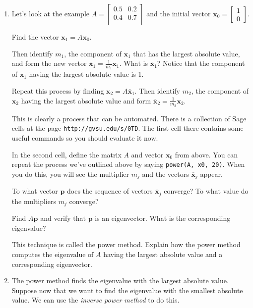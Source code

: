 \documentclass[12pt]{article}
\newcommand{\vs}[1]{\vspace{#1in}}
\newcommand{\xvec}{{\mathbf x}}
\newcommand{\pvec}{{\mathbf p}}
\newcommand{\twovec}[2]{\left[\begin{array}{r}#1 \\ #2
    \end{array}\right]}
\begin{document}
\begin{enumerate}
\item Let's look at the example
  $
  A =
  \left[
    \begin{array}{cc}
      0.5 & 0.2 \\
      0.4 & 0.7 \\
    \end{array}
  \right]
  $
  and the initial vector $\xvec_0=\twovec10$.

  Find the vector $\xvec_1 = A\xvec_0$.

  \vs{1}

  Then identify $m_1$, the component of $\xvec_1$ that has the largest
  absolute value, and form the new vector
  $
  \overline{\xvec}_1 = \frac{1}{m_1}\xvec_1$.  What is
  $\overline{\xvec}_1$?  Notice that the component of
  $\overline{\xvec}_1$ having the largest absolute value is 1.

  \vs{1}
  Repeat this process by finding $\xvec_2 = A\overline{\xvec}_1$.
  Then identify $m_2$, the component of $\xvec_2$ having the largest
  absolute value and form $\overline{\xvec}_2 =
  \frac{1}{m_2}\xvec_2$.

  \vs{1}
  This is clearly a process that can be automated.  There is a
  collection of Sage cells at the page
  {\tt http://gvsu.edu/s/0TD}.  The first cell there contains some
  useful commands so you should evaluate it now.

  \medskip
  In the second cell, define the matrix $A$ and vector $\xvec_0$ from
  above.  You can repeat the process we've outlined above by saying
  {\tt power(A, x0, 20)}.  When you do this, you will see the
  multiplier $m_j$ and the vectors $\overline{\xvec}_j$ appear.

  To what vector $\pvec$ does the sequence of vectors
  $\overline{\xvec}_j$ converge?  To what value do the multipliers
  $m_j$ converge?

  \vs{1}
  Find $A\pvec$ and verify that $\pvec$ is an eigenvector.  What is
  the corresponding eigenvalue?

  \vs{1}
  This technique is called the power method.  Explain how the power
  method computes the eigenvalue of $A$ having the largest absolute
  value and a corresponding eigenvector.

  \vs{1}
\item The power method finds the eigenvalue with the largest absolute
  value.  Suppose now that we want to find the eigenvalue with the
  smallest absolute value.  We can use the {\em inverse power method}
  to do this.


\end{enumerate}
\end{document}
